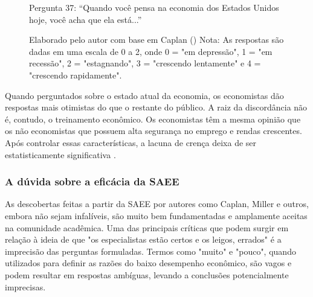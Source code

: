 \begin{figure}[H]
    \centering
    \caption*{Pergunta 37: “Quando você pensa na economia dos Estados Unidos hoje, você acha que ela está...”}
    \caption{Elaborado pelo autor com base em Caplan (\citeyear{The_Myth_of_the_Rational_Voter}) \newline
    Nota: As respostas são dadas em uma escala de 0 a 2, onde 0 = "em depressão", 1 = "em recessão", 2 = "estagnando", 3 = "crescendo lentamente" e 4 = "crescendo rapidamente".}
    \label{fig:pergunta_37}
\end{figure}

Quando perguntados sobre o estado atual da economia, os economistas dão respostas mais otimistas do que o restante do público. A raiz da discordância não é, contudo, o treinamento econômico. Os economistas têm a mesma opinião que os não economistas que possuem alta segurança no emprego e rendas crescentes. Após controlar essas características, a lacuna de crença deixa de ser estatisticamente significativa \cite{The_Myth_of_the_Rational_Voter}.


\subsubsection{A dúvida sobre a eficácia da SAEE}

As descobertas feitas a partir da SAEE por autores como Caplan, Miller e outros, embora não sejam infalíveis, são muito bem fundamentadas e amplamente aceitas na comunidade acadêmica. Uma das principais críticas que podem surgir em relação à ideia de que "os especialistas estão certos e os leigos, errados" é a imprecisão das perguntas formuladas. Termos como "muito" e "pouco", quando utilizados para definir as razões do baixo desempenho econômico, são vagos e podem resultar em respostas ambíguas, levando a conclusões potencialmente imprecisas.

